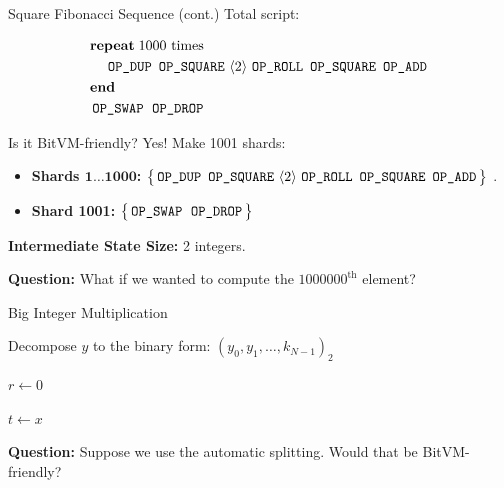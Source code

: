 \documentclass{zkdl-presentation-template}
\newcommand{\elem}[1]{\, \langle #1 \rangle \,}
\newcommand{\opcode}[1]{\, \texttt{#1} \,}
\newcommand{\script}[1]{ $\big\{ #1 \big\}$ }
\begin{document}
    \begin{frame}{Square Fibonacci Sequence (cont.)}
        Total script:
        \begin{empheqboxed}
            \small
          \begin{align*}
            &\textbf{repeat} \; \text{1000 times} \\
            & \;\;\;\; \opcode{\texttt{OP\_DUP}} \, \opcode{\texttt{OP\_SQUARE}} \elem{2} \opcode{\texttt{OP\_ROLL}} \, \opcode{\texttt{OP\_SQUARE}} \, \opcode{\texttt{OP\_ADD}} \\
            & \textbf{end} \\
            & \opcode{\texttt{OP\_SWAP}} \; \opcode{\texttt{OP\_DROP}}
          \end{align*}
        \end{empheqboxed}

        Is it BitVM-friendly? Yes! Make 1001 shards:
        \begin{itemize}
            \item \textbf{Shards $\textbf{1}\dots \textbf{1000}$:} \script{\opcode{\texttt{OP\_DUP}} \, \opcode{\texttt{OP\_SQUARE}} \elem{2} \opcode{\texttt{OP\_ROLL}} \, \opcode{\texttt{OP\_SQUARE}} \, \opcode{\texttt{OP\_ADD}}}.
            \item \textbf{Shard 1001:} \script{\opcode{\texttt{OP\_SWAP}} \; \opcode{\texttt{OP\_DROP}}}
        \end{itemize}

        \textbf{Intermediate State Size:} 2 integers.

        \textbf{Question:} What if we wanted to compute the $1000000^{\text{th}}$ element?
    \end{frame}

    \begin{frame}{Big Integer Multiplication}
        \small
        \begin{algorithm}[H]
          \caption{Double-and-add method for integer multiplication}\label{alg:double_and_add}
          
          Decompose $y$ to the binary form: $(y_0,y_1,\dots,k_{N-1})_2$
          
          $r \gets 0$
          
          $t \gets x$
          
          
          
        \end{algorithm}
        \normalsize

        \textbf{Question:} Suppose we use the automatic splitting. Would that be BitVM-friendly?
    \end{frame}
\end{document}
